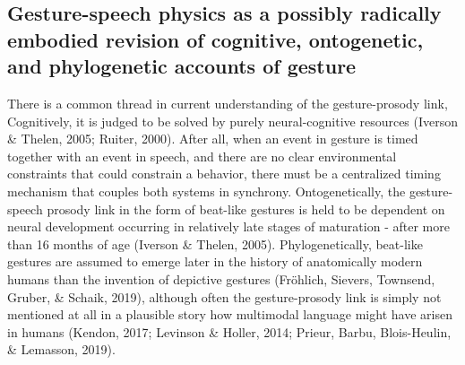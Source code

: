 \documentclass[
  man, noextraspace,floatsintext]{apa6}
\begin{document}
\hypertarget{gesture-speech-physics-as-a-possibly-radically-embodied-revision-of-cognitive-ontogenetic-and-phylogenetic-accounts-of-gesture}{%
\subsection{Gesture-speech physics as a possibly radically embodied revision of cognitive, ontogenetic, and phylogenetic accounts of gesture}\label{gesture-speech-physics-as-a-possibly-radically-embodied-revision-of-cognitive-ontogenetic-and-phylogenetic-accounts-of-gesture}}

There is a common thread in current understanding of the gesture-prosody link, Cognitively, it is judged to be solved by purely neural-cognitive resources (Iverson \& Thelen, 2005; Ruiter, 2000). After all, when an event in gesture is timed together with an event in speech, and there are no clear environmental constraints that could constrain a behavior, there must be a centralized timing mechanism that couples both systems in synchrony. Ontogenetically, the gesture-speech prosody link in the form of beat-like gestures is held to be dependent on neural development occurring in relatively late stages of maturation - after more than 16 months of age (Iverson \& Thelen, 2005). Phylogenetically, beat-like gestures are assumed to emerge later in the history of anatomically modern humans than the invention of depictive gestures (Fröhlich, Sievers, Townsend, Gruber, \& Schaik, 2019), although often the gesture-prosody link is simply not mentioned at all in a plausible story how multimodal language might have arisen in humans (Kendon, 2017; Levinson \& Holler, 2014; Prieur, Barbu, Blois-Heulin, \& Lemasson, 2019).\\
\end{document}
